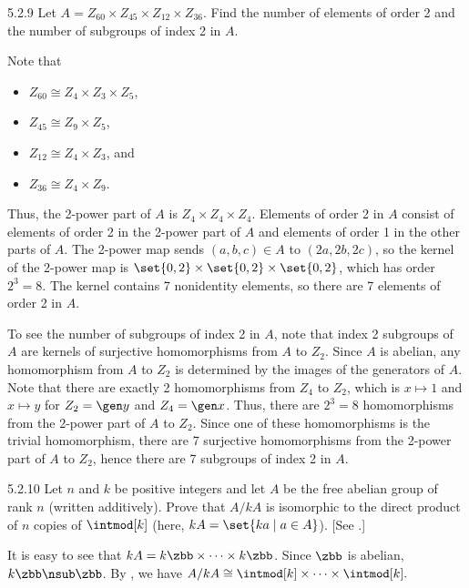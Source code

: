 \begin{exercise}{5.2.9}
    Let $A = Z_{60} \times Z_{45} \times Z_{12} \times Z_{36}$.
	Find the number of elements of order 2 and the number of subgroups of index 2 in $A$.
\end{exercise}

\begin{sol}
    Note that
    \begin{itemize}
        \item $Z_{60} \cong Z_4 \times Z_3 \times Z_5$,
        \item $Z_{45} \cong Z_9 \times Z_5$,
        \item $Z_{12} \cong Z_4 \times Z_3$, and
        \item $Z_{36} \cong Z_4 \times Z_9$.
    \end{itemize}
    Thus, the 2-power part of $A$ is $Z_4 \times Z_4 \times Z_4$.
	Elements of order 2 in $A$ consist of elements of order 2 in the 2-power part of $A$ and elements of order 1 in the other parts of $A$.
    The 2-power map sends $(a, b, c) \in A$ to $(2a, 2b, 2c)$, so the kernel of the 2-power map is $\set{0, 2} \times \set{0, 2} \times \set{0, 2}$, which has order $2^3 = 8$.
    The kernel contains 7 nonidentity elements, so there are 7 elements of order 2 in $A$.

    To see the number of subgroups of index 2 in $A$, note that index 2 subgroups of $A$ are kernels of surjective homomorphisms from $A$ to $Z_2$.
    Since $A$ is abelian, any homomorphism from $A$ to $Z_2$ is determined by the images of the generators of $A$.
    Note that there are exactly 2 homomorphisms from $Z_4$ to $Z_2$, which is $x \mapsto 1$ and $x \mapsto y$ for $Z_2 = \gen y$ and $Z_4 = \gen x$.
    Thus, there are $2^3 = 8$ homomorphisms from the 2-power part of $A$ to $Z_2$.
    Since one of these homomorphisms is the trivial homomorphism, there are 7 surjective homomorphisms from the 2-power part of $A$ to $Z_2$, hence there are 7 subgroups of index 2 in $A$.
\end{sol}

\begin{exercise}{5.2.10}
    Let $n$ and $k$ be positive integers and let $A$ be the free abelian group of rank $n$ (written additively).
	Prove that $A/kA$ is isomorphic to the direct product of $n$ copies of $\intmod[k]$ (here, $kA = \set{ka \mid a \in A}$). [See .]
\end{exercise}

\begin{sol}
    It is easy to see that $kA = k\zbb \times \cdots \times k\zbb$.
	Since $\zbb$ is abelian, $k\zbb \nsub \zbb$.
	By , we have $A/kA \cong \intmod[k] \times \cdots \times \intmod[k].$
\end{sol}

